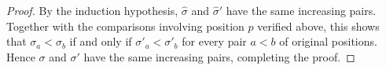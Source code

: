 \documentclass[10pt,a4paper]{amsart}
\begin{document}
\begin{proof}
By the induction hypothesis, $\widehat{\sigma}$ and $\widehat{\sigma}'$ have the
same increasing pairs. Together with the comparisons involving position $p$
verified above, this shows that $\sigma_a<\sigma_b$ if and only if
$\sigma'_a<\sigma'_b$ for every pair $a<b$ of original positions. Hence $\sigma$
and $\sigma'$ have the same increasing pairs, completing the proof.
\end{proof}
\end{document}

